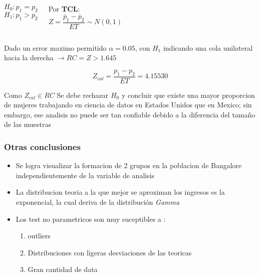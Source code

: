 \documentclass{beamer}
\begin{document}
\begin{frame}

  \begin{columns}
   \[H_0: p_1 = p_2\]
   \[H_1: p_1 > p_2\]


    Por \textbf{TCL}:
      \[\textit{Z} = \frac{\overline{p}_1 - \overline{p}_2}{ET} \sim N(0, 1)\]
      \newline

  \end{columns}

  Dado un error maximo permitido $\alpha = 0.05$, con \textit{$H_1$} indicando una cola unilateral
  hacia la derecha $\rightarrow RC = {Z > 1.645}$

  \[Z_{cal} = \frac{p_1 - p_2}{ET} = 4.15530\]

  Como \textit{$Z_{cal} \in RC$} Se debe rechazar \textit{$H_0$} y concluir que
  existe una mayor proporcion de mujeres trabajando en ciencia de datos en Estados
  Unidos que en Mexico; sin embargo, ese analisis no puede ser tan confiable debido
  a la diferencia del tamaño de las muestras

\end{frame}

\begin{frame}

  \frametitle{Otras conclusiones}

  \begin{itemize}
    \item Se logra visualizar la formacion de 2 grupos en la poblacion
      de Bangalore independientemente de la variable de analisis

    \item La distribucion teoria a la que mejor se aproximan los ingresos
      es la exponencial, la cual deriva de la distribución \textit{Gamma}

    \item Los test no parametricos son muy suceptibles a :
      \begin{enumerate}
        \item outliers
        \item Distribuciones con ligeras desviaciones de las teoricas
        \item Gran cantidad de data
      \end{enumerate}
  \end{itemize}


\end{frame}
\end{document}
